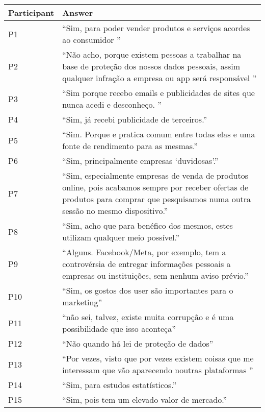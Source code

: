 \begin{table}[H]
    \begin{longtable}{p{3cm} p{13cm}}
        \hline
        \textbf{Participant} & \textbf{Answer} \\
        \hline
        P1 & ``Sim, para poder vender produtos e serviços acordes ao consumidor '' \\
        \hline
        P2 & ``Não acho, porque existem pessoas a trabalhar na base de proteção dos nossos dados pessoais, assim qualquer infração a empresa ou app será responsável '' \\
        \hline
        P3 & ``Sim porque recebo emails e publicidades de sites que nunca acedi e desconheço. '' \\
        \hline
        P4 & ``Sim, já recebi publicidade de terceiros.'' \\
        \hline
        P5 & ``Sim. Porque e pratica comum entre todas elas e uma fonte de rendimento para as mesmas.'' \\
        \hline
        P6 & ``Sim, principalmente empresas `duvidosas'.'' \\
        \hline
        P7 & ``Sim, especialmente empresas de venda de produtos online, pois acabamos sempre por receber ofertas de produtos para comprar que pesquisamos numa outra sessão no mesmo dispositivo.'' \\
        \hline
        P8 & ``Sim, acho que para benéfico dos mesmos, estes utilizam qualquer meio possível.'' \\
        \hline
        P9 & ``Alguns. Facebook/Meta, por exemplo, tem a controvérsia de entregar informações pessoais a empresas ou instituições, sem nenhum aviso prévio.'' \\
        \hline
        P10 & ``Sim, os gostos  dos user são importantes para o marketing'' \\
        \hline
        P11 & ``não sei, talvez, existe muita corrupção e é uma possibilidade que isso aconteça'' \\
        \hline
        P12 & ``Não quando há lei de proteção de dados'' \\
        \hline
        P13 & ``Por vezes, visto que por vezes existem coisas que me interessam que vão aparecendo noutras plataformas '' \\
        \hline
        P14 & ``Sim, para estudos estatísticos.'' \\
        \hline
        P15 & ``Sim, pois tem um elevado valor de mercado.'' \\

\end{longtable}
\end{table}
